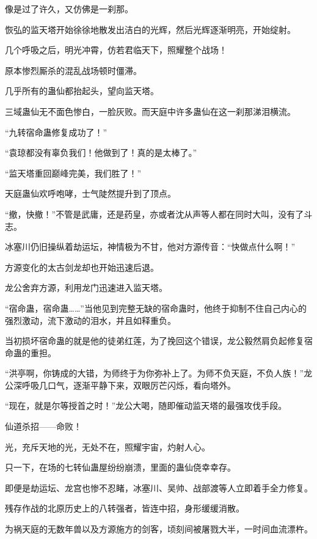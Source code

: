 
\begin{this_body}



像是过了许久，又仿佛是一刹那。

恢弘的监天塔开始徐徐地散发出洁白的光辉，然后光辉逐渐明亮，开始绽射。

几个呼吸之后，明光冲霄，仿若君临天下，照耀整个战场！

原本惨烈厮杀的混乱战场顿时僵滞。

几乎所有的蛊仙都抬起头，望向监天塔。

三域蛊仙无不面色惨白，一脸灰败。而天庭中许多蛊仙在这一刹那涕泪横流。

“九转宿命蛊修复成功了！”

“袁琼都没有辜负我们！他做到了！真的是太棒了。”

“监天塔重回巅峰完美，我们胜了！”

天庭蛊仙欢呼咆哮，士气陡然提升到了顶点。

“撤，快撤！”不管是武庸，还是药皇，亦或者沈从声等人都在同时大叫，没有了斗志。

冰塞川仍旧操纵着劫运坛，神情极为不甘，他对方源传音：“快做点什么啊！”

方源变化的太古剑龙却也开始迅速后退。

龙公舍弃方源，利用龙门迅速进入监天塔。

“宿命蛊，宿命蛊……”当他见到完整无缺的宿命蛊时，他终于抑制不住自己内心的强烈激动，流下激动的泪水，并且如释重负。

当初损坏宿命蛊的就是他的徒弟红莲，为了挽回这个错误，龙公毅然肩负起修复宿命蛊的重担。

“洪亭啊，你铸成的大错，为师终于为你弥补上了。为师不负天庭，不负人族！”龙公深呼吸几口气，逐渐平静下来，双眼厉芒闪烁，看向塔外。

“现在，就是尔等授首之时！”龙公大喝，随即催动监天塔的最强攻伐手段。

仙道杀招——命败！

光，充斥天地的光，无处不在，照耀宇宙，灼射人心。

只一下，在场的七转仙蛊屋纷纷崩溃，里面的蛊仙侥幸幸存。

即便是劫运坛、龙宫也惨不忍睹，冰塞川、吴帅、战部渡等人立即着手全力修复。

残存作战的北原历史上的八转强者，皆连中招，身形缓缓消散。

为祸天庭的无数年兽以及方源施方的剑客，顷刻间被屠戮大半，一时间血流漂杵。


\end{this_body}

